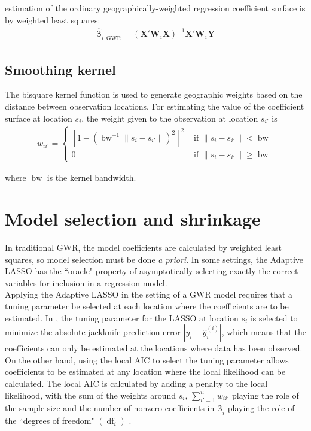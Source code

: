 \documentclass[authoryear, review, 11pt]{elsarticle}
\DeclareMathOperator*{\bw}{\mbox{bw}}
\DeclareMathOperator*{\df}{\mbox{df}}
\begin{document}
	estimation of the ordinary geographically-weighted regression coefficient surface is by weighted least squares:	
	\begin{eqnarray}
		\hat{\bm{\beta}}_{i, \mbox{GWR}} = \left( \bm{X}'\bm{W}_i\bm{X} \right)^{-1} \bm{X}'\bm{W}_i\bm{Y}
	\end{eqnarray}
	
	 
	 \subsection{Smoothing kernel}
	 	The bisquare kernel function is used to generate geographic weights based on the distance between observation locations. For estimating the value of the coefficient surface at location $s_i$, the weight given to the observation at location $s_{i'}$ is	
	\begin{eqnarray}
		w_{ii'} = \begin{cases} \left[ 1-\left( \bw^{-1} \|s_i-s_{i'}\| \right)^2 \right]^2 & \mbox{ if } \|s_i-s_{i'}\| < \bw \\ 0 & \mbox{ if } \|s_i-s_{i'}\| \geq \bw \end{cases}
	\end{eqnarray}
	
	where $\bw$ is the kernel bandwidth.\\
	
\section{Model selection and shrinkage \label{section:method}}
	In traditional GWR, the model coefficients are calculated by weighted least squares, so model selection must be done \emph{a priori}. In some settings, the Adaptive LASSO \citep{Zou:2006} has the ``oracle" property of asymptotically selecting exactly the correct variables for inclusion in a regression model.\\

	Applying the Adaptive LASSO in the setting of a GWR model requires that a tuning parameter be selected at each location where the coefficients are to be estimated. In \cite{Wheeler:2009}, the tuning parameter for the LASSO at location $s_i$ is selected to minimize the absolute jackknife prediction error $|y_i - \hat{y}_i^{(i)}|$, which means that the coefficients can only be estimated at the locations where data has been observed. On the other hand, using the local AIC to select the tuning parameter allows coefficients to be estimated at any location where the local likelihood can be calculated. The local AIC is calculated by adding a penalty to the local likelihood, with the sum of the weights around $s_i$, $\sum_{i'=1}^n w_{ii'}$ playing the role of the sample size and the number of nonzero coefficients in $\bm{\beta}_i$ playing the role of the ``degrees of freedom" $\left( \df_i \right)$ \citep{Zou:2007}.\\
\end{document}
